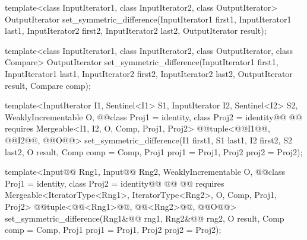 %
\begin{removedblock}
\begin{itemdecl}
template<class InputIterator1, class InputIterator2,
         class OutputIterator>
  OutputIterator
    set_symmetric_difference(InputIterator1 first1, InputIterator1 last1,
                             InputIterator2 first2, InputIterator2 last2,
                             OutputIterator result);

template<class InputIterator1, class InputIterator2,
         class OutputIterator, class Compare>
  OutputIterator
    set_symmetric_difference(InputIterator1 first1, InputIterator1 last1,
                             InputIterator2 first2, InputIterator2 last2,
                             OutputIterator result, Compare comp);
\end{itemdecl}
\end{removedblock}
\begin{addedblock}
\begin{itemdecl}
template<InputIterator I1, Sentinel<I1> S1, InputIterator I2, Sentinel<I2> S2,
    WeaklyIncrementable O, @@class Proj1 = identity, class Proj2 = identity@\oldtxt{,}\newtxt{>}@
    @@
  requires Mergeable<I1, I2, O, Comp, Proj1, Proj2>
  @@tuple<@@I1@\newtxt{)}@, @@I2@\newtxt{)}@, @@O@\newtxt{)}@>
    set_symmetric_difference(I1 first1, S1 last1, I2 first2, S2 last2, O result,
                             Comp comp = Comp{}, Proj1 proj1 = Proj1{},
                             Proj2 proj2 = Proj2{});

template<Input@@ Rng1, Input@@ Rng2, WeaklyIncrementable O,
    @@class Proj1 = identity, class Proj2 = identity@\oldtxt{,}\newtxt{>}@
    @@
      @@
  requires Mergeable<IteratorType<Rng1>, IteratorType<Rng2>, O, Comp, Proj1, Proj2>
  @@tuple<@@<Rng1>@\newtxt{)}@,
               @@<Rng2>@\newtxt{)}@,
               @@O@\newtxt{)}@>
    set_symmetric_difference(Rng1&@\newtxt{\&}@ rng1, Rng2&@\newtxt{\&}@ rng2, O result, Comp comp = Comp{},
                             Proj1 proj1 = Proj1{}, Proj2 proj2 = Proj2{});
\end{itemdecl}
\end{addedblock}

